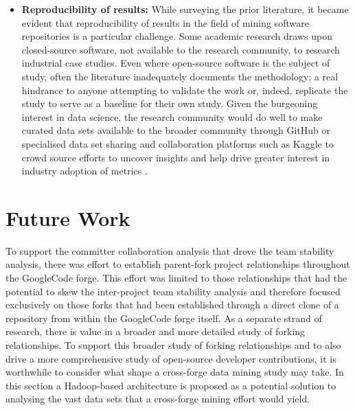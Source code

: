 \begin{itemize}
\item  \textbf{Reproducibility of results: } While surveying the prior literature, it became evident that reproducibility of results in the field of mining software repositories is a particular challenge. Some academic research draws upon closed-source software, not available to the research community, to research industrial case studies. Even where open-source software is the subject of study, often the literature inadequately documents the methodology; a real hindrance to anyone attempting to validate the work or, indeed, replicate the study to serve as a baseline for their own study. Given the burgeoning interest in data science, the research community would do well to make curated data sets available to the broader community through GitHub or specialised data set sharing and collaboration platforms such as Kaggle to crowd source efforts to uncover insights and help drive greater interest in industry adoption of metrics \citep{github, kaggle}.

\end{itemize}

\section{Future Work} %
To support the committer collaboration analysis that drove the team stability analysis, there was effort to establish parent-fork project relationships throughout the GoogleCode forge. This effort was limited to those relationships that had the potential to skew the inter-project team stability analysis and therefore focused exclusively on those forks that had been established through a direct clone of a repository from within the GoogleCode forge itself. As a separate strand of research, there is value in a broader and more detailed study of forking relationships.
To support this broader study of forking relationships and to also drive a more comprehensive study of open-source developer contributions, it is worthwhile to consider what shape a cross-forge data mining study may take. In this section a Hadoop-based architecture is proposed as a potential solution to analysing the vast data sets that a cross-forge mining effort would yield. 

